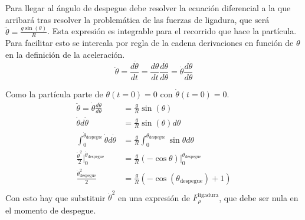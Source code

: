 \documentclass[11pt, spanish, a4paper, twoside]{article}
\begin{document}
\begin{enumerate}
	Para llegar al ángulo de despegue debe resolver la ecuación diferencial a la que arribará tras resolver la problemática de las fuerzas de ligadura, que será $\ddot{\theta} = \frac{g \sin(\theta)}{R}$.
	Esta expresión es integrable para el recorrido que hace la partícula.
	Para facilitar esto se intercala por regla de la cadena derivaciones en función de \(\theta\) en la definición de la aceleración.
	$$
		\ddot{\theta} 
		= \frac{d \dot{\theta} }{d t} 
		= \frac{d \theta}{d t} \frac{d \dot{\theta}}{d \theta} 
		= \dot{\theta} \frac{d \dot{\theta}}{d \theta}
	$$

	Como la partícula parte de $\theta(t=0) = 0$ con $\dot{\theta}(t=0) = 0$.
	$$
	\begin{aligned}
		\ddot{\theta} = \dot{\theta} \frac{d \dot{\theta}}{d \theta}
		&= \frac{g}{R} \sin(\theta)\\
		\dot{\theta} d \dot{\theta}
		&= \frac{g}{R} \sin(\theta) d \theta \\
		\int_0^{\dot{\theta}_\mathrm{despegue}} \dot{\theta} d \dot{\theta}
		&= \frac{g}{R} \int_0^{\theta_\mathrm{despegue}} \sin{\theta} d \theta\\
		\frac{\dot{\theta}^2}{2} \bigg|_0^{\dot{\theta}_\mathrm{despegue}}
		&= \frac{g}{R} (-\cos{\theta}) \bigg|_0^{\theta_\mathrm{despegue}}\\
		\frac{\dot{\theta}_\mathrm{despegue}^2}{2}
		&= \frac{g}{R} (-\cos(\theta_\mathrm{despegue}) + 1)\\
	\end{aligned}
	$$
	Con esto hay que substituir $\dot{\theta}^2$ en una expresión de $F^\mathrm{ligadura}_{\rho}$, que debe ser nula en el momento de despegue.


\end{enumerate}
\end{document}
